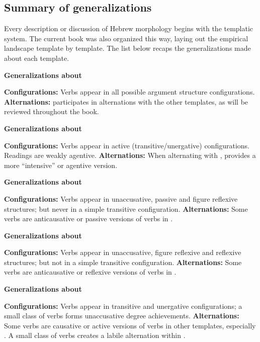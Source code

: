 	\subsection{Summary of generalizations}
Every description or discussion of Hebrew morphology begins with the templatic system. The current book was also organized this way, laying out the empirical landscape template by template. The list below recaps the generalizations made about each template.

 \begin{exe}
 \ex  \textbf{Generalizations about {\tkal}} 
 \begin{xlist} 
 	\ex  \textbf{Configurations:} Verbs appear in all possible argument structure configurations. 
 	\ex  \textbf{Alternations:} {\tkal} participates in alternations with the other templates, as will be reviewed throughout the book. 
 \z

 \ex  \textbf{Generalizations about {\tpie}} 
 \begin{xlist} 
 	\ex  \textbf{Configurations:} Verbs appear in active (transitive/unergative) configurations. 
		Readings are weakly agentive.
 	\ex  \textbf{Alternations:} When alternating with {\tkal}, {\tpie} provides a more ``intensive'' or agentive version. 
 \z

 \ex  \textbf{Generalizations about {\tnif}} 
 \begin{xlist} 
 	\ex  \textbf{Configurations:} Verbs appear in unaccusative, passive and figure reflexive structures; but never in a simple transitive configuration. 
 	\ex  \textbf{Alternations:} Some verbs are anticausative or passive versions of verbs in {\tkal}. 
 \z

 \ex  \textbf{Generalizations about {\thit}} 
 \begin{xlist} 
 	\ex  \textbf{Configurations:} Verbs appear in unaccusative, figure reflexive and reflexive structures; but not in a simple transitive configuration. 
 	\ex  \textbf{Alternations:} Some verbs are anticausative or reflexive versions of verbs in {\tpie}. 
 \z

 \ex  \textbf{Generalizations about {\thif}} 
 \begin{xlist} 
 	\ex  \textbf{Configurations:} Verbs appear in transitive and unergative configurations; a small class of verbs forms unaccusative degree achievements. 
 	\ex  \textbf{Alternations:} Some verbs are causative or active versions of verbs in other templates, especially {\tkal}. A small class of verbs creates a labile alternation within {\thif}. 
 \z


\end{xlist}
\end{xlist}
\end{xlist}
\end{xlist}
\end{xlist}
\end{exe}
